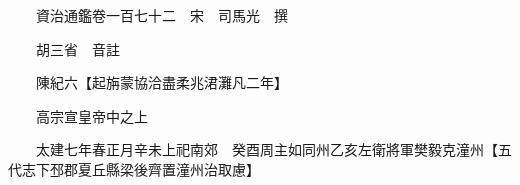 










 


 
 


 

  
  
  
  
  





  
  
  
  
  
 
  

  

  
  
  



  

 
 

  
   




  

  
  


  　　資治通鑑卷一百七十二　宋　司馬光　撰

　　胡三省　音註

　　陳紀六【起旃蒙協洽盡柔兆涒灘凡二年】

　　高宗宣皇帝中之上

　　太建七年春正月辛未上祀南郊　癸酉周主如同州乙亥左衛將軍樊毅克潼州【五代志下邳郡夏丘縣梁後齊置潼州治取慮】

